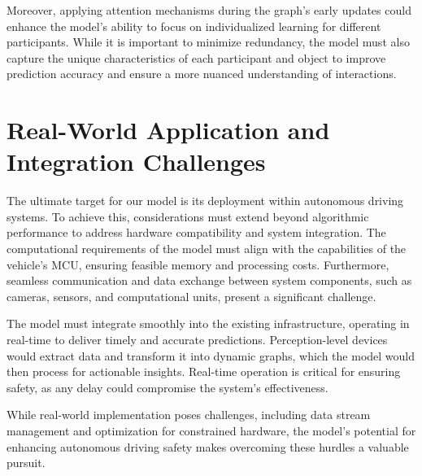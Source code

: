 Moreover, applying attention mechanisms during the graph's early updates could enhance the model's ability to focus on individualized learning for different participants. While it is important to minimize redundancy, the model must also capture the unique characteristics of each participant and object to improve prediction accuracy and ensure a more nuanced understanding of interactions.



\section{Real-World Application and Integration Challenges}
The ultimate target for our model is its deployment within autonomous driving systems. To achieve this, considerations must extend beyond algorithmic performance to address hardware compatibility and system integration. The computational requirements of the model must align with the capabilities of the vehicle's MCU, ensuring feasible memory and processing costs. Furthermore, seamless communication and data exchange between system components, such as cameras, sensors, and computational units, present a significant challenge.

The model must integrate smoothly into the existing infrastructure, operating in real-time to deliver timely and accurate predictions. Perception-level devices would extract data and transform it into dynamic graphs, which the model would then process for actionable insights. Real-time operation is critical for ensuring safety, as any delay could compromise the system's effectiveness.

While real-world implementation poses challenges, including data stream management and optimization for constrained hardware, the model's potential for enhancing autonomous driving safety makes overcoming these hurdles a valuable pursuit.

